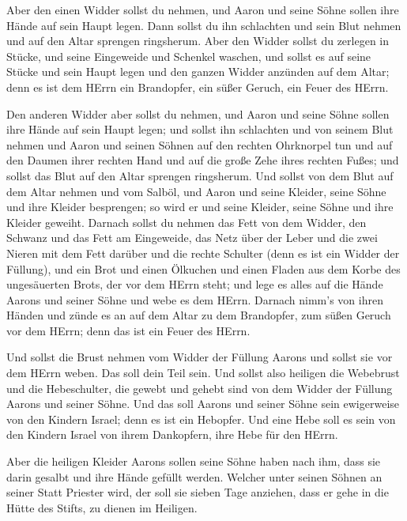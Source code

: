  Aber den einen Widder sollst du nehmen, und Aaron und
seine Söhne sollen ihre Hände auf sein Haupt legen.  Dann
sollst du ihn schlachten und sein Blut nehmen und auf den Altar sprengen
ringsherum.  Aber den Widder sollst du zerlegen in Stücke,
und seine Eingeweide und Schenkel waschen, und sollst es auf seine
Stücke und sein Haupt legen  und den ganzen Widder anzünden
auf dem Altar; denn es ist dem HErrn ein Brandopfer, ein süßer Geruch,
ein Feuer des HErrn.

 Den anderen Widder aber sollst du nehmen, und Aaron und
seine Söhne sollen ihre Hände auf sein Haupt legen;  und
sollst ihn schlachten und von seinem Blut nehmen und Aaron und seinen
Söhnen auf den rechten Ohrknorpel tun und auf den Daumen ihrer rechten
Hand und auf die große Zehe ihres rechten Fußes; und sollst das Blut auf
den Altar sprengen ringsherum.  Und sollst von dem Blut auf
dem Altar nehmen und vom Salböl, und Aaron und seine Kleider, seine
Söhne und ihre Kleider besprengen; so wird er und seine Kleider, seine
Söhne und ihre Kleider geweiht.  Darnach sollst du nehmen
das Fett von dem Widder, den Schwanz und das Fett am Eingeweide, das
Netz über der Leber und die zwei Nieren mit dem Fett darüber und die
rechte Schulter (denn es ist ein Widder der Füllung),  und
ein Brot und einen Ölkuchen und einen Fladen aus dem Korbe des
ungesäuerten Brots, der vor dem HErrn steht;  und lege es
alles auf die Hände Aarons und seiner Söhne und webe es dem HErrn.
 Darnach nimm's von ihren Händen und zünde es an auf dem
Altar zu dem Brandopfer, zum süßen Geruch vor dem HErrn; denn das ist
ein Feuer des HErrn.

 Und sollst die Brust nehmen vom Widder der Füllung Aarons
und sollst sie vor dem HErrn weben. Das soll dein Teil sein.
 Und sollst also heiligen die Webebrust und die
Hebeschulter, die gewebt und gehebt sind von dem Widder der Füllung
Aarons und seiner Söhne.  Und das soll Aarons und seiner
Söhne sein ewigerweise von den Kindern Israel; denn es ist ein Hebopfer.
Und eine Hebe soll es sein von den Kindern Israel von ihrem Dankopfern,
ihre Hebe für den HErrn.

 Aber die heiligen Kleider Aarons sollen seine Söhne haben
nach ihm, dass sie darin gesalbt und ihre Hände gefüllt werden.
 Welcher unter seinen Söhnen an seiner Statt Priester wird,
der soll sie sieben Tage anziehen, dass er gehe in die Hütte des Stifts,
zu dienen im Heiligen.

